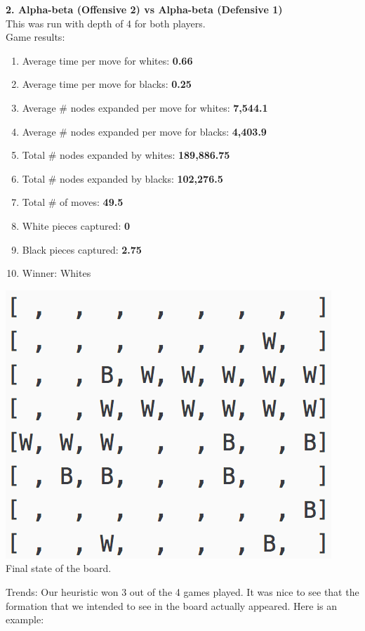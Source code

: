 \documentclass[11pt]{article}
\begin{document}
\pagebreak
\textbf{2. Alpha-beta (Offensive 2) vs Alpha-beta (Defensive 1)}\\
This was run with depth of 4 for both players.\\
Game results:\\
\begin{enumerate}
\item Average time per move for whites: \textbf{0.66}
\item Average time per move for blacks: \textbf{0.25}
\item Average \# nodes expanded per move for whites: \textbf{7,544.1}
\item Average \# nodes expanded per move for blacks:  \textbf{4,403.9}
\item Total \# nodes expanded by whites: \textbf{189,886.75}
\item Total \# nodes expanded by blacks: \textbf{102,276.5}
\item Total \# of moves: \textbf{49.5}
\item White pieces captured: \textbf{0}
\item Black pieces captured: \textbf{2.75}
\item Winner: Whites
\end{enumerate}
\begin{center}
\includegraphics[scale=1]{part2/ab-o2-vs-ab-d1.png}\\
Final state of the board.
\end{center}
Trends: Our heuristic won 3 out of the 4 games played. It was nice to see that the formation that we intended to see in the board actually appeared. Here is an example: \\
\end{document}

